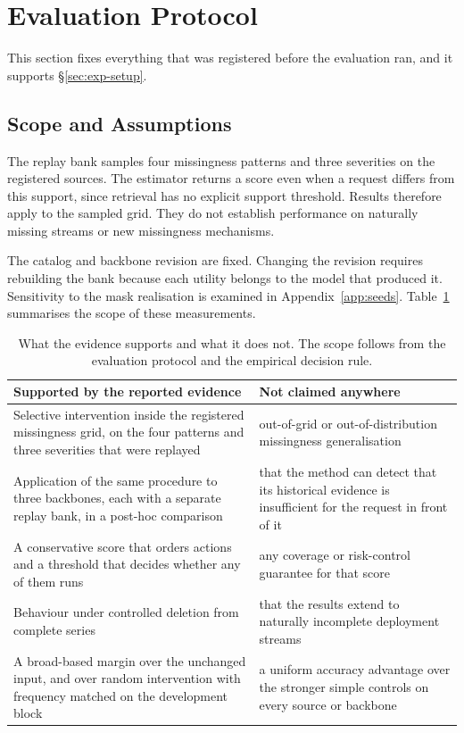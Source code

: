 \documentclass{article}
\begin{document}
\section{Evaluation Protocol}
\label{app:protocol}

This section fixes everything that was registered before the evaluation ran, and it
supports \S\ref{sec:exp-setup}.

\subsection{Scope and Assumptions}
\label{app:scope}
The replay bank samples four missingness patterns and three severities on the registered
sources. The estimator returns a score even when a request differs from this support, since
retrieval has no explicit support threshold. Results therefore apply to the sampled grid.
They do not establish performance on naturally missing streams or new missingness mechanisms.

The catalog and backbone revision are fixed. Changing the revision requires rebuilding the
bank because each utility belongs to the model that produced it. Sensitivity to the mask
realisation is examined in Appendix~\ref{app:seeds}.
Table~\ref{tab:app-claims} summarises the scope of these measurements.

\begin{table}[htbp]
  \caption{What the evidence supports and what it does not. The scope follows from the evaluation protocol and the empirical decision rule.}
  \label{tab:app-claims}
  \centering
  \small
  \setlength{\tabcolsep}{4pt}
\begin{tabular}{@{}p{} p{}@{}}
    \toprule
    Supported by the reported evidence & Not claimed anywhere \\
    \midrule
    Selective intervention inside the registered missingness grid, on the four patterns and three severities that were replayed & out-of-grid or out-of-distribution missingness generalisation \\
    Application of the same procedure to three backbones, each with a separate replay bank, in a post-hoc comparison & that the method can detect that its historical evidence is insufficient for the request in front of it \\
    A conservative score that orders actions and a threshold that decides whether any of them runs & any coverage or risk-control guarantee for that score \\
    Behaviour under controlled deletion from complete series & that the results extend to naturally incomplete deployment streams \\
    A broad-based margin over the unchanged input, and over random intervention with frequency matched on the development block & a uniform accuracy advantage over the stronger simple controls on every source or backbone \\
    \bottomrule
  \end{tabular}
\end{table}
\end{document}
